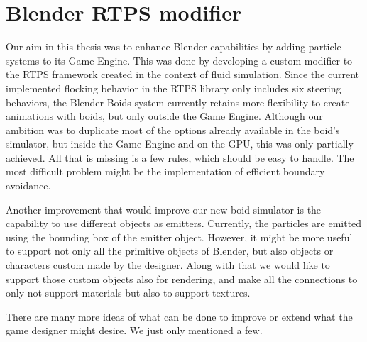 \section{Blender RTPS modifier}
Our aim in this thesis was to enhance Blender capabilities by adding particle systems to its Game Engine. This was done by developing a custom modifier to the RTPS framework created in the context of fluid simulation. Since the current implemented flocking behavior in the RTPS library only includes six steering behaviors, the Blender Boids system currently retains more flexibility to create animations with boids, but only outside the Game Engine.  Although our ambition was to duplicate most of the options already available in the boid's simulator, but inside the Game Engine and on the GPU, this was only partially achieved. All that is missing is a few rules, which should be easy to handle. The most difficult problem might be the implementation of efficient  boundary avoidance. 

Another improvement that would improve our new boid simulator is the capability to use different objects as emitters. Currently, the particles are emitted using the bounding box of the emitter object. However, it might be more useful to support not only all the primitive objects of Blender, but also objects or characters custom made by the designer. Along with that we would like to support those custom objects also for rendering, and make all the connections to only not support materials but also to support textures.

There are many more ideas of what can be done to improve or extend what the game designer might desire. We just only mentioned a few.

